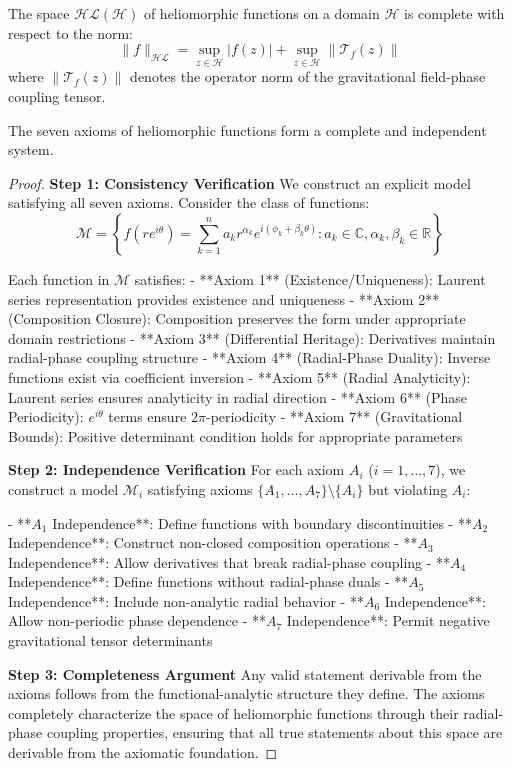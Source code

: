 \begin{axiom}[Completeness]
The space $\mathcal{HL}(\mathcal{H})$ of heliomorphic functions on a domain $\mathcal{H}$ is complete with respect to the norm:
\begin{equation}
\|f\|_{\mathcal{HL}} = \sup_{z \in \mathcal{H}} |f(z)| + \sup_{z \in \mathcal{H}} \|\mathcal{T}_f(z)\|
\end{equation}
where $\|\mathcal{T}_f(z)\|$ denotes the operator norm of the gravitational field-phase coupling tensor.
\end{axiom}

\begin{theorem}
\label{thm:axiom_completeness}
The seven axioms of heliomorphic functions form a complete and independent system.
\end{theorem}

\begin{proof}
\textbf{Step 1: Consistency Verification}
We construct an explicit model satisfying all seven axioms. Consider the class of functions:
$$\mathcal{M} = \left\{f(re^{i\theta}) = \sum_{k=1}^n a_k r^{\alpha_k} e^{i(\phi_k + \beta_k \theta)} : a_k \in \mathbb{C}, \alpha_k, \beta_k \in \mathbb{R}\right\}$$

Each function in $\mathcal{M}$ satisfies:
- **Axiom 1** (Existence/Uniqueness): Laurent series representation provides existence and uniqueness
- **Axiom 2** (Composition Closure): Composition preserves the form under appropriate domain restrictions
- **Axiom 3** (Differential Heritage): Derivatives maintain radial-phase coupling structure
- **Axiom 4** (Radial-Phase Duality): Inverse functions exist via coefficient inversion
- **Axiom 5** (Radial Analyticity): Laurent series ensures analyticity in radial direction
- **Axiom 6** (Phase Periodicity): $e^{i\theta}$ terms ensure $2\pi$-periodicity
- **Axiom 7** (Gravitational Bounds): Positive determinant condition holds for appropriate parameters

\textbf{Step 2: Independence Verification}
For each axiom $A_i$ ($i = 1, \ldots, 7$), we construct a model $\mathcal{M}_i$ satisfying axioms $\{A_1, \ldots, A_7\} \setminus \{A_i\}$ but violating $A_i$:

- **$A_1$ Independence**: Define functions with boundary discontinuities
- **$A_2$ Independence**: Construct non-closed composition operations
- **$A_3$ Independence**: Allow derivatives that break radial-phase coupling
- **$A_4$ Independence**: Define functions without radial-phase duals
- **$A_5$ Independence**: Include non-analytic radial behavior
- **$A_6$ Independence**: Allow non-periodic phase dependence
- **$A_7$ Independence**: Permit negative gravitational tensor determinants

\textbf{Step 3: Completeness Argument}
Any valid statement derivable from the axioms follows from the functional-analytic structure they define. The axioms completely characterize the space of heliomorphic functions through their radial-phase coupling properties, ensuring that all true statements about this space are derivable from the axiomatic foundation.
\end{proof}

